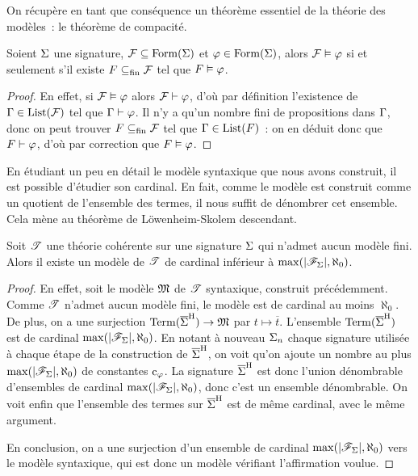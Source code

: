 On récupère en tant que conséquence un théorème essentiel de la théorie des
modèles~: le théorème de compacité.

\begin{theorem}\label{thm.compacite}
  Soient $\Sigma$ une signature, $\mathcal F \subseteq\operatorname{Form}(\Sigma)$ et
  $\varphi\in\operatorname{Form}(\Sigma)$, alors $\mathcal F\vDash \varphi$
  si et seulement s'il existe
  $F\subseteq_{\mathrm{fin}} \mathcal F$ tel que $F\vDash \varphi$.
\end{theorem}

\begin{proof}
  En effet, si $\mathcal F\vDash \varphi$ alors $\mathcal F\vdash \varphi$, d'où par
  définition l'existence de $\Gamma\in\operatorname{List}(\mathcal F)$ tel que
  $\Gamma\vdash \varphi$.
  Il n'y a qu'un nombre fini de propositions dans $\Gamma$,
  donc on peut trouver $F\subseteq_{\mathrm{fin}}\mathcal F$ tel que
  $\Gamma\in\operatorname{List}(F)$~: on en déduit donc que $F\vdash \varphi$,
  d'où par correction que $F\vDash \varphi$.
\end{proof}

En étudiant un peu en détail le modèle syntaxique que nous avons construit, il
est possible d'étudier son cardinal. En fait, comme le modèle est construit
comme un quotient de l'ensemble des termes, il nous suffit de dénombrer cet
ensemble. Cela mène au théorème de Löwenheim-Skolem descendant.

\begin{theorem}
  Soit $\mathscr T$ une théorie cohérente sur une signature $\Sigma$ qui
  n'admet aucun modèle fini. Alors il existe un modèle de $\mathscr T$ de
  cardinal inférieur à $\max(|\mathscr F_{\Sigma}|,\aleph_0)$.
\end{theorem}

\begin{proof}
  En effet, soit le modèle $\mathfrak{M}$ de $\mathscr T$ syntaxique, construit
  précédemment. Comme $\mathscr T$ n'admet aucun modèle fini, le modèle est de
  cardinal au moins $\aleph_0$. De plus, on a une surjection
  $\operatorname{Term}(\overline{\Sigma}^{\mathrm H}) \to \mathfrak{M}$ par $t\mapsto \overline t$. L'ensemble
  $\operatorname{Term}(\overline{\Sigma}^{\mathrm H})$ est de cardinal $\max(|\mathscr F_{\Sigma}|,\aleph_0)$.
  En notant à nouveau $\Sigma_n$ chaque signature utilisée à chaque
  étape de la construction de $\overline{\Sigma}^{\mathrm H}$, on voit qu'on ajoute un nombre
  au plus $\max(|\mathscr F_{\Sigma}|,\aleph_0)$ de constantes $\mathrm{c}_{\varphi}$.
  La signature
  $\overline{\Sigma}^{\mathrm H}$ est donc l'union dénombrable d'ensembles de cardinal
  $\max(|\mathscr F_{\Sigma}|,\aleph_0)$, donc c'est un ensemble dénombrable.
  On voit enfin que l'ensemble des termes sur $\overline{\Sigma}^{\mathrm H}$ est de même
  cardinal, avec le même argument.

  En conclusion, on a une surjection d'un ensemble de cardinal
  $\max(|\mathscr F_{\Sigma}|,\aleph_0)$ vers le modèle syntaxique, qui est donc
  un modèle vérifiant l'affirmation voulue.
\end{proof}

